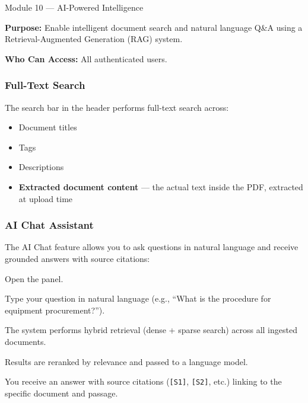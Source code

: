 \begin{ugModule}{Module 10 --- AI-Powered Intelligence}

  \textbf{Purpose:}
  Enable intelligent document search and natural language Q\&A
  using a Retrieval-Augmented Generation (RAG) system.

  \textbf{Who Can Access:}
  All authenticated users.

  \subsubsection*{Full-Text Search}
  The search bar in the header performs full-text search across:
  \begin{itemize}[leftmargin=18pt]
    \item Document titles
    \item Tags
    \item Descriptions
    \item \textbf{Extracted document content} --- the actual text
      inside the PDF, extracted at upload time
  \end{itemize}

  \subsubsection*{AI Chat Assistant}
  The AI Chat feature allows you to ask questions in natural
  language and receive grounded answers with source citations:

  \begin{ugSteps}
    \item Open the  panel.
    \item Type your question in natural language
          (e.g., ``What is the procedure for equipment
          procurement?'').
    \item The system performs hybrid retrieval (dense + sparse
          search) across all ingested documents.
    \item Results are reranked by relevance and passed to a
          language model.
    \item You receive an answer with source citations
          (\texttt{[S1]}, \texttt{[S2]}, etc.) linking to the
          specific document and passage.
  \end{ugSteps}


\end{ugModule}
